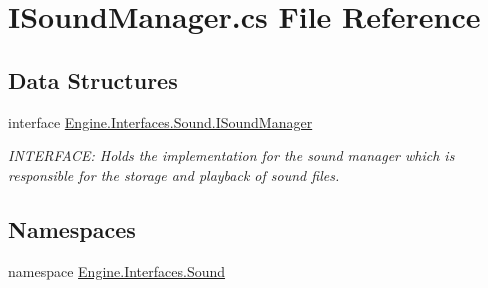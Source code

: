\hypertarget{a00143}{}\section{I\+Sound\+Manager.\+cs File Reference}
\label{a00143}
\subsection*{Data Structures}
\begin{DoxyCompactItemize}
\item 
interface \hyperlink{a00482}{Engine.\+Interfaces.\+Sound.\+I\+Sound\+Manager}
\begin{DoxyCompactList}\small\item\em I\+N\+T\+E\+R\+F\+A\+CE\+: Holds the implementation for the sound manager which is responsible for the storage and playback of sound files. \end{DoxyCompactList}\end{DoxyCompactItemize}
\subsection*{Namespaces}
\begin{DoxyCompactItemize}
\item 
namespace \hyperlink{a00265}{Engine.\+Interfaces.\+Sound}
\end{DoxyCompactItemize}
